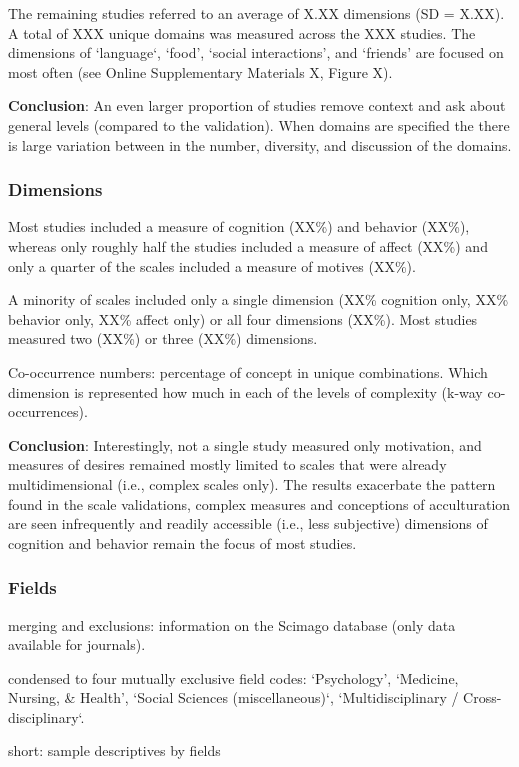 \documentclass[man, 12pt, a4paper]{apa7}
\begin{document}
The remaining studies referred to an average of X.XX dimensions (SD = X.XX). A total of XXX unique domains was measured across the XXX studies. The dimensions of ‘language‘, ‘food’, ‘social interactions’, and ‘friends’ are focused on most often (see Online Supplementary Materials X, Figure X).

\textbf{Conclusion}: An even larger proportion of studies remove context and ask about general levels (compared to the validation). When domains are specified the there is large variation between in the number, diversity, and discussion of the domains.

\subsubsection{Dimensions}
Most studies included a measure of cognition (XX\%) and behavior (XX\%), whereas only roughly half the studies included a measure of affect (XX\%) and only a quarter of the scales included a measure of motives (XX\%).

A minority of scales included only a single dimension (XX\% cognition only, XX\% behavior only, XX\% affect only) or all four dimensions (XX\%). Most studies measured two (XX\%) or three (XX\%) dimensions.

Co-occurrence numbers: percentage of concept in unique combinations. Which dimension is represented how much in each of the levels of complexity (k-way co-occurrences).

\textbf{Conclusion}: Interestingly, not a single study measured only motivation, and measures of desires remained mostly limited to scales that were already multidimensional (i.e., complex scales only). The results exacerbate the pattern found in the scale validations, complex measures and conceptions of acculturation are seen infrequently and readily accessible (i.e., less subjective) dimensions of cognition and behavior remain the focus of most studies.

\subsubsection{Fields}
merging and exclusions: information on the Scimago database (only data available for journals).

condensed to four mutually exclusive field codes: ‘Psychology’, ‘Medicine, Nursing, \& Health’, ‘Social Sciences (miscellaneous)‘, ‘Multidisciplinary / Cross-disciplinary‘.

short: sample descriptives by fields
\end{document}
